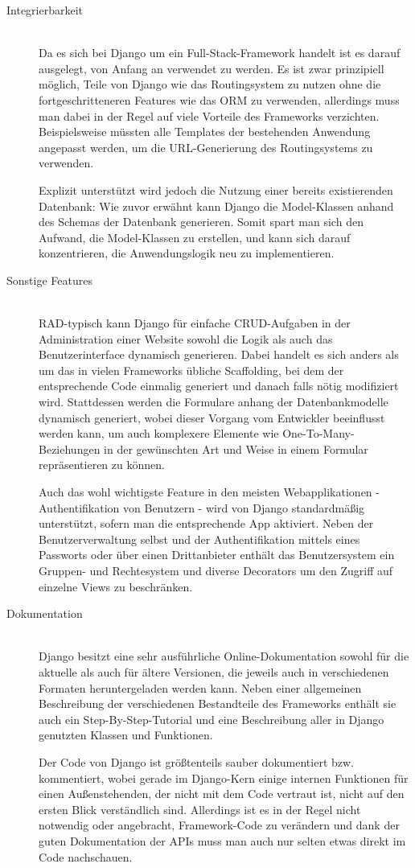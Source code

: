 \begin{description}
\item[Integrierbarkeit] \hfill \\
Da es sich bei Django um ein Full-Stack-Framework handelt ist es darauf ausgelegt, von Anfang an
verwendet zu werden. Es ist zwar prinzipiell möglich, Teile von Django wie das Routingsystem zu
nutzen ohne die fortgeschritteneren Features wie das ORM zu verwenden, allerdings muss man dabei in
der Regel auf viele Vorteile des Frameworks verzichten. Beispielsweise müssten alle Templates der
bestehenden Anwendung angepasst werden, um die URL-Generierung des Routingsystems zu verwenden.

Explizit unterstützt wird jedoch die Nutzung einer bereits existierenden Datenbank: Wie zuvor
erwähnt kann Django die Model-Klassen anhand des Schemas der Datenbank generieren. Somit spart man
sich den Aufwand, die Model-Klassen zu erstellen, und kann sich darauf konzentrieren, die
Anwendungslogik neu zu implementieren.


\item[Sonstige Features] \hfill \\
RAD-typisch kann Django für einfache CRUD-Aufgaben in der Administration einer Website sowohl die
Logik als auch das Benutzerinterface dynamisch generieren. Dabei handelt es sich anders als um das
in vielen Frameworks übliche Scaffolding, bei dem der entsprechende Code einmalig generiert und
danach falls nötig modifiziert wird. Stattdessen werden die Formulare anhang der Datenbankmodelle
dynamisch generiert, wobei dieser Vorgang vom Entwickler beeinflusst werden kann, um auch komplexere
Elemente wie One-To-Many-Beziehungen in der gewünschten Art und Weise in einem Formular
repräsentieren zu können.

Auch das wohl wichtigste Feature in den meisten Webapplikationen - Authentifikation von Benutzern -
wird von Django standardmäßig unterstützt, sofern man die entsprechende App aktiviert. Neben der
Benutzerverwaltung selbst und der Authentifikation mittels eines Passworts oder über einen
Drittanbieter enthält das Benutzersystem ein Gruppen- und Rechtesystem und diverse Decorators um
den Zugriff auf einzelne Views zu beschränken.


\item[Dokumentation] \hfill \\
Django besitzt eine sehr ausführliche Online-Dokumentation sowohl für die aktuelle als auch für
ältere Versionen, die jeweils auch in verschiedenen Formaten heruntergeladen werden kann. Neben
einer allgemeinen Beschreibung der verschiedenen Bestandteile des Frameworks enthält sie auch ein
Step-By-Step-Tutorial und eine Beschreibung aller in Django genutzten Klassen und Funktionen.

Der Code von Django ist größtenteils sauber dokumentiert bzw. kommentiert, wobei gerade im
Django-Kern einige internen Funktionen für einen Außenstehenden, der nicht mit dem Code vertraut
ist, nicht auf den ersten Blick verständlich sind. Allerdings ist es in der Regel nicht notwendig
oder angebracht, Framework-Code zu verändern und dank der guten Dokumentation der APIs muss man auch
nur selten etwas direkt im Code nachschauen.


\end{description}
